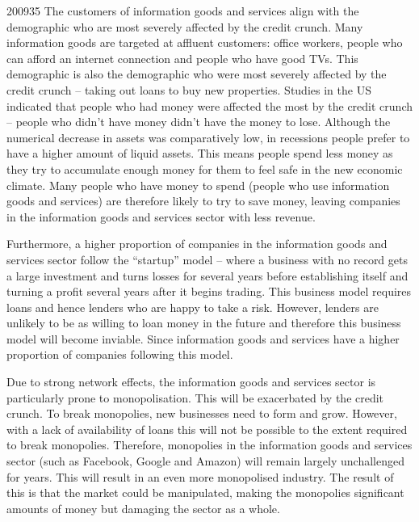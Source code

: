 \documentclass[a4paper]{article}
\begin{document}
\begin{examquestion}{2009}{3}{5}
The customers of information goods and services align with the demographic
who are most severely affected by the credit crunch. Many information goods
are targeted at affluent customers: office workers, people who can afford an
internet connection and people who have good TVs. This demographic is also
the demographic who were most severely affected by the credit crunch --
taking out loans to buy new properties. Studies in the US indicated that
people who had money were affected the most by the credit crunch -- people who
didn't have money didn't have the money to lose. Although the numerical
decrease in assets was comparatively low, in recessions people prefer to
have a higher amount of liquid assets. This means people spend less money as
they try to accumulate enough money for them to feel safe in the new
economic climate. Many people who have money to spend (people who use
information goods and services) are therefore likely to try to save money,
leaving companies in the information goods and services sector with less
revenue.

Furthermore, a higher proportion of companies in the information goods and
services sector follow the ``startup'' model -- where a business with no
record gets a large investment and turns losses for several years before
establishing itself and turning a profit several years after it begins
trading. This business model requires loans and hence lenders who are happy
to take a risk. However, lenders are unlikely to be as willing to loan money
in the future and therefore this business model will become inviable. Since
information goods and services have a higher proportion of companies
following this model.

Due to strong network effects, the information goods and services sector is
particularly prone to monopolisation. This will be exacerbated by the credit
crunch. To break monopolies, new businesses need to form and grow. However,
with a lack of availability of loans this will not be possible to the extent
required to break monopolies. Therefore, monopolies in the information goods
and services sector (such as Facebook, Google and Amazon) will remain
largely unchallenged for years. This will result in an even more monopolised
industry. The result of this is that the market could be manipulated, making
the monopolies significant amounts of money but damaging the sector as a whole.


\end{examquestion}
\end{document}
